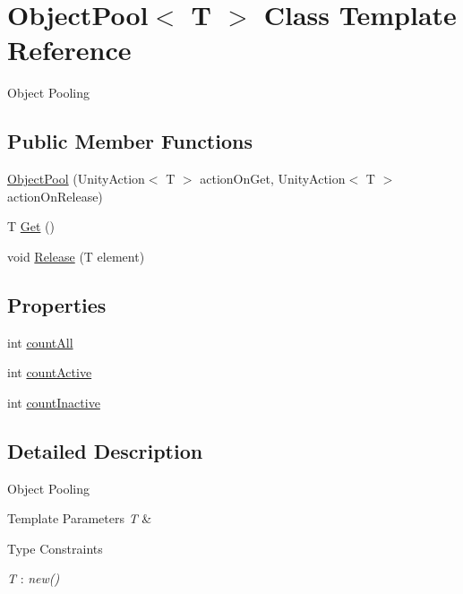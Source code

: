 \hypertarget{class_object_pool}{}\section{Object\+Pool$<$ T $>$ Class Template Reference}
\label{class_object_pool}


Object Pooling  


\subsection*{Public Member Functions}
\begin{DoxyCompactItemize}
\item 
\mbox{\hyperlink{class_object_pool_ac7f7c5e592e12b2b9d7ed59ec64a2d6d}{Object\+Pool}} (Unity\+Action$<$ T $>$ action\+On\+Get, Unity\+Action$<$ T $>$ action\+On\+Release)
\item 
T \mbox{\hyperlink{class_object_pool_a28b7e503afcecfb7f8ae7647c7efdff8}{Get}} ()
\item 
void \mbox{\hyperlink{class_object_pool_af85041dbe64efa883573f2ad8e24f852}{Release}} (T element)
\end{DoxyCompactItemize}
\subsection*{Properties}
\begin{DoxyCompactItemize}
\item 
int \mbox{\hyperlink{class_object_pool_a8a492d46b6230a2afe750a843e05a148}{count\+All}}
\item 
int \mbox{\hyperlink{class_object_pool_a1c7d97c9434247225b9d887072110c8f}{count\+Active}}
\item 
int \mbox{\hyperlink{class_object_pool_afd6b674fd2d20832cf244c2804e1df9a}{count\+Inactive}}
\end{DoxyCompactItemize}


\subsection{Detailed Description}
Object Pooling 


\begin{DoxyTemplParams}{Template Parameters}
{\em T} & \\
\hline
\end{DoxyTemplParams}
\begin{Desc}
\item[Type Constraints]\begin{description}
\item[{\em T} : {\em new()}]\end{description}
\end{Desc}


